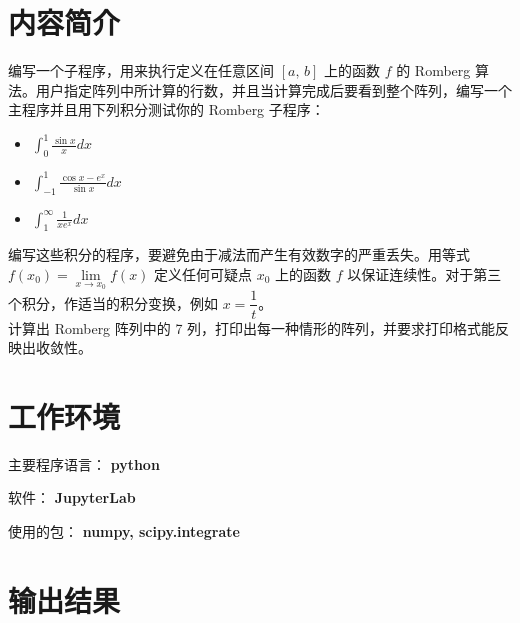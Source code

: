 \documentclass{ctexart}
\begin{document}
\section*{内容简介}
	编写一个子程序，用来执行定义在任意区间 $[a,\,b]$ 上的函数 $f$ 的 Romberg 算法。用户指定阵列中所计算的行数，并且当计算完成后要看到整个阵列，编写一个主程序并且用下列积分测试你的 Romberg 子程序：
	\begin{itemize}
		\item $\displaystyle\int_0^1 \frac{\sin x}{x} dx$
		\item $\displaystyle\int_{-1}^{1} \frac{\cos x - e^x}{\sin x} dx$
		\item $\displaystyle\int_1^\infty \frac{1}{x e^x} dx$
	\end{itemize}
	
	编写这些积分的程序，要避免由于减法而产生有效数字的严重丢失。用等式 $f(x_0) = \lim\limits_{x \rightarrow x_0} f(x)$ 定义任何可疑点 $x_0$ 上的函数 $f$ 以保证连续性。对于第三个积分，作适当的积分变换，例如 $x = \dfrac{1}{t}$。\\
	
	计算出 Romberg 阵列中的 7 列，打印出每一种情形的阵列，并要求打印格式能反映出收敛性。


\section*{工作环境}
	主要程序语言： {\bf python}
	
	软件： {\bf JupyterLab}
	
	使用的包： {\bf numpy, scipy.integrate}

\section*{输出结果}
\end{document}
